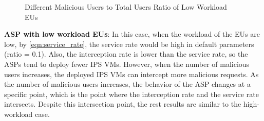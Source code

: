 \documentclass[10pt,journal, compsoc]{IEEEtran}
\begin{document}
\begin{figure}[!]
\captionsetup{justification=centering}
  \hfill
  \hfill
\label{fig:ratio_low}
\caption{Different Malicious Users to Total Users Ratio of Low Workload EUs}
\end{figure}


\textbf{ASP with low workload EUs}: In this case, when the workload of the EUs are low, by \cref{eqn:service_rate}, the service rate would be high in default parameters (ratio = 0.1). Also, the interception rate is lower than the service rate, so the ASPs tend to deploy fewer IPS VMs. However, when the number of malicious users increases, the deployed IPS VMs can intercept more malicious requests. As the number of malicious users increases, the behavior of the ASP changes at a specific point, which is the point where the interception rate and the service rate intersects. Despite this intersection point, the rest results are similar to the high-workload case.


\end{document}
